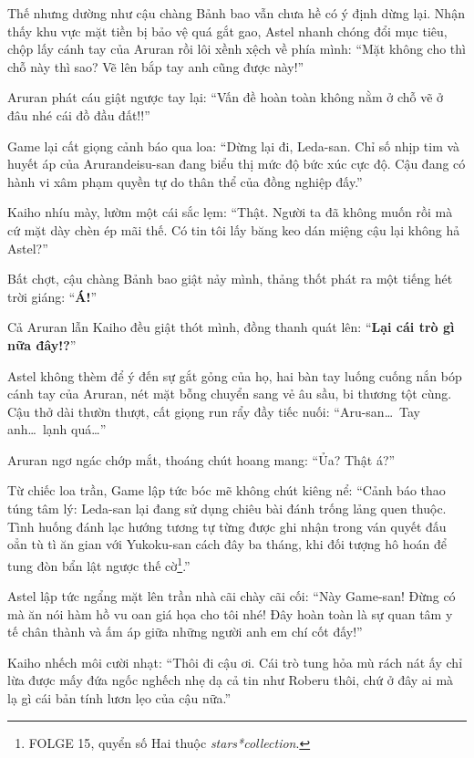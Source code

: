 \documentclass[../main.tex]{subfiles}
\begin{document}

Thế nhưng dường như cậu chàng Bảnh bao vẫn chưa hề có ý định dừng lại. Nhận thấy khu vực mặt tiền bị bảo vệ quá gắt gao, Astel nhanh chóng đổi mục tiêu, chộp lấy cánh tay của Aruran rồi lôi xềnh xệch về phía mình: ``Mặt không cho thì chỗ này thì sao? Vẽ lên bắp tay anh cũng được này!''

Aruran phát cáu giật ngược tay lại: ``Vấn đề hoàn toàn không nằm ở chỗ vẽ ở đâu nhé cái đồ đầu đất!!''

Game lại cất giọng cảnh báo qua loa: ``Dừng lại đi, Leda-san. Chỉ số nhịp tim và huyết áp của Arurandeisu-san đang biểu thị mức độ bức xúc cực độ. Cậu đang có hành vi xâm phạm quyền tự do thân thể của đồng nghiệp đấy.''

Kaiho nhíu mày, lườm một cái sắc lẹm: ``Thật. Người ta đã không muốn rồi mà cứ mặt dày chèn ép mãi thế. Có tin tôi lấy băng keo dán miệng cậu lại không hả Astel?''

Bất chợt, cậu chàng Bảnh bao giật nảy mình, thảng thốt phát ra một tiếng hét trời giáng: ``\textbf{Á!}''

Cả Aruran lẫn Kaiho đều giật thót mình, đồng thanh quát lên: ``\textbf{Lại cái trò gì nữa đây!?}''

Astel không thèm để ý đến sự gắt gỏng của họ, hai bàn tay luống cuống nắn bóp cánh tay của Aruran, nét mặt bỗng chuyển sang vẻ âu sầu, bi thương tột cùng. Cậu thở dài thườn thượt, cất giọng run rẩy đầy tiếc nuối: ``Aru-san\dots\ Tay anh\dots\ lạnh quá\dots''


Aruran ngơ ngác chớp mắt, thoáng chút hoang mang: ``Ủa? Thật á?''

Từ chiếc loa trần, Game lập tức bóc mẽ không chút kiêng nể: ``Cảnh báo thao túng tâm lý: Leda-san lại đang sử dụng chiêu bài đánh trống lảng quen thuộc. Tình huống đánh lạc hướng tương tự từng được ghi nhận trong ván quyết đấu oẳn tù tì ăn gian với Yukoku-san cách đây ba tháng, khi đối tượng hô hoán để tung đòn bẩn lật ngược thế cờ\footnote{{\humanist FOLGE 15}, quyển số Hai thuộc \textit{stars*collection}.}.''

Astel lập tức ngẩng mặt lên trần nhà cãi chày cãi cối: ``Này Game-san! Đừng có mà ăn nói hàm hồ vu oan giá họa cho tôi nhé! Đây hoàn toàn là sự quan tâm y tế chân thành và ấm áp giữa những người anh em chí cốt đấy!''

Kaiho nhếch môi cười nhạt: ``Thôi đi cậu ơi. Cái trò tung hỏa mù rách nát ấy chỉ lừa được mấy đứa ngốc nghếch nhẹ dạ cả tin như Roberu thôi, chứ ở đây ai mà lạ gì cái bản tính lươn lẹo của cậu nữa.''
\end{document}
